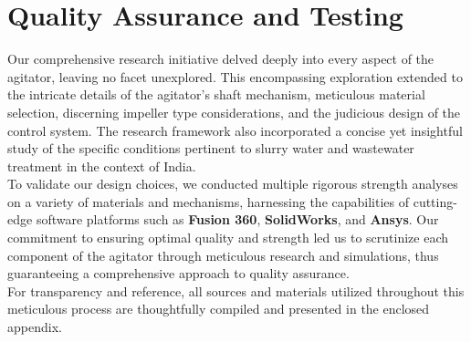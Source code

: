 \documentclass[a4,10pt]{report}
\begin{document}
\section{Quality Assurance and Testing}
Our comprehensive research initiative delved deeply into every aspect of the agitator, leaving no facet unexplored. This encompassing exploration extended to the intricate details of the agitator's shaft mechanism, meticulous material selection, discerning impeller type considerations, and the judicious design of the control system. The research framework also incorporated a concise yet insightful study of the specific conditions pertinent to slurry water and wastewater treatment in the context of India. 
\vspace{2mm} \\
To validate our design choices, we conducted multiple rigorous strength analyses on a variety of materials and mechanisms, harnessing the capabilities of cutting-edge software platforms such as \textbf{Fusion 360}, \textbf{SolidWorks}, and \textbf{Ansys}. Our commitment to ensuring optimal quality and strength led us to scrutinize each component of the agitator through meticulous research and simulations, thus guaranteeing a comprehensive approach to quality assurance. 
\vspace{2mm} \\
For transparency and reference, all sources and materials utilized throughout this meticulous process are thoughtfully compiled and presented in the enclosed appendix.
\end{document}

